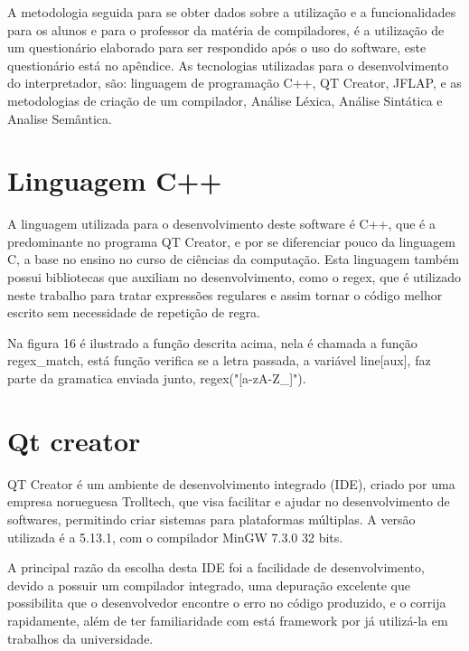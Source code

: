 \documentclass[12pt,oneside,a4paper,chapter=TITLE,section=TITLE,sumario=tradicional]{abntex2}
\begin{document}
A metodologia seguida para se obter dados sobre a utilização e a funcionalidades para os alunos e para o professor da matéria de compiladores, é a utilização de um questionário elaborado para ser respondido após o uso do software, este questionário está no apêndice.
As tecnologias utilizadas para o desenvolvimento do interpretador, são: linguagem de programação C++, QT Creator, JFLAP, e as metodologias de criação de um compilador, Análise Léxica, Análise Sintática e Analise Semântica.  

\section{Linguagem C++}
\label{sec:linugagemc++}

A linguagem utilizada para o desenvolvimento deste software é C++, que é a predominante no programa QT Creator, e por se diferenciar pouco da linguagem C, a base no ensino no curso de ciências da computação. Esta linguagem também possui bibliotecas que auxiliam no desenvolvimento, como o regex, que é utilizado neste trabalho para tratar expressões regulares e assim tornar o código melhor escrito sem necessidade de repetição de regra.

Na figura 16 é ilustrado a função descrita acima, nela é chamada a função regex\_match, está função verifica se a letra passada, a variável line[aux], faz parte da gramatica enviada junto, regex("[a-zA-Z\_]").

\begin{figure}[htb]
\end{figure} 

\section{Qt creator}
\label{sec:qtcreator}

QT Creator é um ambiente de desenvolvimento integrado (IDE), criado por uma empresa norueguesa Trolltech, que visa facilitar e ajudar no desenvolvimento de softwares, permitindo criar sistemas para plataformas múltiplas. A versão utilizada é a 5.13.1, com o compilador MinGW 7.3.0 32 bits. 

A principal razão da escolha desta IDE foi a facilidade de desenvolvimento, devido a possuir um compilador integrado, uma depuração excelente que possibilita que o desenvolvedor encontre o erro no código produzido, e o corrija rapidamente, além de ter familiaridade com está framework por já utilizá-la em trabalhos da universidade. 
\end{document}
